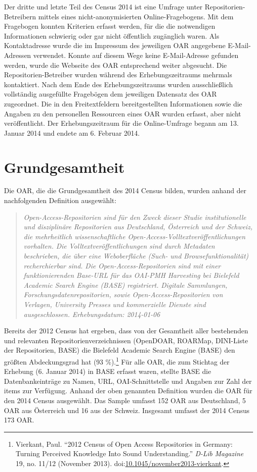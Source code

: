 \documentclass[a4paper,
fontsize=11pt,
oneside,
numbers=noperiodatend,
parskip=half-,
bibliography=totoc,
final
]{scrartcl}
\begin{document}
Der dritte und letzte Teil des Census 2014 ist eine Umfrage unter
Repositorien-Betreibern mittels eines nicht-anonymisierten
Online-Fragebogens. Mit dem Fragebogen konnten Kriterien erfasst werden,
für die die notwendigen Informationen schwierig oder gar nicht
öffentlich zugänglich waren. Als Kontaktadresse wurde die im Impressum
des jeweiligen OAR angegebene E-Mail-Adressen verwendet. Konnte auf
diesem Wege keine E-Mail-Adresse gefunden werden, wurde die Webseite des
OAR entsprechend weiter abgesucht. Die Repositorien-Betreiber wurden
während des Erhebungszeitraums mehrmals kontaktiert. Nach dem Ende des
Erhebungszeitraums wurden ausschließlich vollständig ausgefüllte
Fragebögen dem jeweiligen Datensatz des OAR zugeordnet. Die in den
Freitextfeldern bereitgestellten Informationen sowie die Angaben zu den
personellen Ressourcen eines OAR wurden erfasst, aber nicht
veröffentlicht. Der Erhebungszeitraum für die Online-Umfrage begann am
13. Januar 2014 und endete am 6. Februar 2014.

\section*{Grundgesamtheit}\label{grundgesamtheit}

Die OAR, die die Grundgesamtheit des 2014 Census bilden, wurden anhand
der nachfolgenden Definition ausgewählt:

\begin{quote}
\emph{Open-Access-Repositorien sind für den Zweck dieser Studie
institutionelle und disziplinäre Repositorien aus Deutschland,
Österreich und der Schweiz, die mehrheitlich wissenschaftliche
Open-Access-Volltextveröffentlichungen vorhalten. Die
Volltextveröffentlichungen sind durch Metadaten beschrieben, die über
eine Weboberfläche (Such- und Browsefunktionalität) recherchierbar sind.
Die Open-Access-Repositorien sind mit einer funktionierenden Base-URL
für das OAI-PMH Harvesting bei Bielefeld Academic Search Engine (BASE)
registriert. Digitale Sammlungen, Forschungsdatenrepositorien, sowie
Open-Access-Repositorien von Verlagen, University Presses und
kommerzielle Dienste sind ausgeschlossen. Erhebungsdatum: 2014-01-06}
\end{quote}

Bereits der 2012 Census hat ergeben, dass von der Gesamtheit aller
bestehenden und relevanten Repositorienverzeichnissen (OpenDOAR,
ROARMap, DINI-Liste der Repositorien, BASE) die Bielefeld Academic
Search Engine (BASE) den größten Abdeckungsgrad hat (93 \%).\footnote{Vierkant,
  Paul. \enquote{2012 Census of Open Access Repositories in Germany:
  Turning Perceived Knowledge Into Sound Understanding.} \emph{D-Lib
  Magazine} 19, no. 11/12 (November 2013).
  doi:\href{http://doi.org/10.1045/november2013-vierkant}{10.1045/november2013-vierkant}.}
Für alle OAR, die zum Stichtag der Erhebung (6. Januar 2014) in BASE
erfasst waren, stellte BASE die Datenbankeinträge zu Namen, URL,
OAI-Schnittstelle und Angaben zur Zahl der items zur Verfügung. Anhand
der oben genannten Definition wurden die OAR für den 2014 Census
ausgewählt. Das Sample umfasst 152 OAR aus Deutschland, 5 OAR aus
Österreich und 16 aus der Schweiz. Insgesamt umfasst der 2014 Census 173
OAR.
\end{document}
